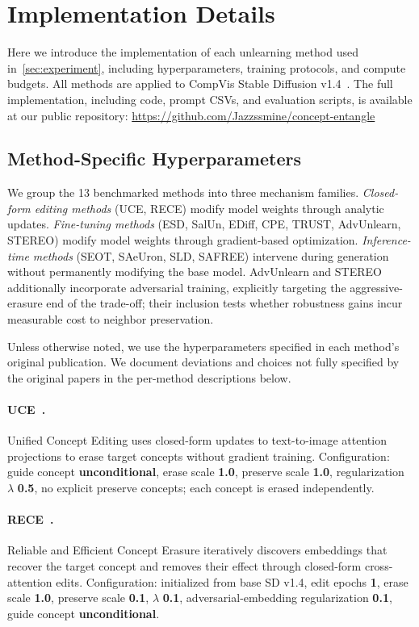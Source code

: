 \section{Implementation Details}
\label{app:implementation}
Here we introduce the implementation of each unlearning method used in~\cref{sec:experiment}, including hyperparameters, training protocols, and compute budgets. All methods are applied to CompVis Stable Diffusion v1.4~\citep{rombach2022high}. The full implementation, including code, prompt CSVs, and evaluation scripts, is available at our public repository:
\url{https://github.com/Jazzssmine/concept-entangle}

\subsection{Method-Specific Hyperparameters}
We group the 13 benchmarked methods into three mechanism families.
\emph{Closed-form editing methods} (UCE, RECE) modify model weights through analytic updates. 
\emph{Fine-tuning methods} (ESD, SalUn, EDiff, CPE, TRUST, AdvUnlearn, STEREO) modify model weights through gradient-based optimization.
\emph{Inference-time methods} (SEOT, SAeUron, SLD, SAFREE) intervene during generation without permanently modifying the base model. AdvUnlearn and STEREO additionally incorporate adversarial training, explicitly targeting the aggressive-erasure end of the trade-off; their inclusion tests whether robustness gains incur measurable cost to neighbor preservation.

Unless otherwise noted, we use the hyperparameters specified in each method's original publication. We document deviations and choices not fully specified by the original papers in the per-method descriptions below.

\paragraph{UCE~\citep{gandikota2024unified}.}
Unified Concept Editing uses closed-form updates to text-to-image attention projections to erase target concepts without gradient training. Configuration: guide concept \textbf{unconditional}, erase scale \textbf{1.0}, preserve scale \textbf{1.0}, regularization $\lambda$ \textbf{0.5}, no explicit preserve concepts; each concept is erased independently.

\paragraph{RECE~\citep{gong2024reliable}.}
Reliable and Efficient Concept Erasure iteratively discovers embeddings that recover the target concept and removes their effect through closed-form cross-attention edits.
Configuration: initialized from base SD v1.4, edit epochs \textbf{1}, erase scale \textbf{1.0}, preserve scale \textbf{0.1}, $\lambda$ \textbf{0.1}, adversarial-embedding regularization \textbf{0.1}, guide concept \textbf{unconditional}.


